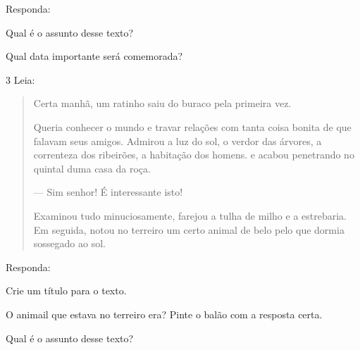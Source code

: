 
Responda:

\begin{escolha}
\item Qual é o assunto desse texto?


\item Qual data importante será comemorada?

\end{escolha}

\num{3} Leia:


\begin{quote}
Certa manhã, um ratinho saiu do buraco pela primeira vez.

Queria conhecer o mundo e travar relações com tanta coisa bonita de que
falavam seus amigos. Admirou a luz do sol, o verdor das árvores, a
correnteza dos ribeirões, a habitação dos homens. e acabou penetrando no
quintal duma casa da roça.

--- Sim senhor! É interessante isto!

Examinou tudo minuciosamente, farejou a tulha de milho e a estrebaria.
Em seguida, notou no terreiro um certo animal de belo pelo que dormia
sossegado ao sol.
\end{quote}


Responda:

\begin{escolha}
\item Crie um título para o texto.


\item O animail que estava no terreiro era? Pinte o balão com a resposta certa.

\item Qual é o assunto desse texto?

\end{escolha}

